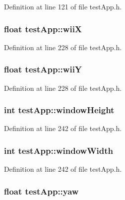 Definition at line 121 of file test\-App.\-h.

\hypertarget{classtest_app_a7a77e8633c3a94e3e409a33a5cd9ae3f}{
\subsubsection[{wii\-X}]{\setlength{\rightskip}{0pt plus 5cm}float test\-App\-::wii\-X}}\label{classtest_app_a7a77e8633c3a94e3e409a33a5cd9ae3f}


Definition at line 228 of file test\-App.\-h.

\hypertarget{classtest_app_a5ae41896388ae16ee530beca5333e02a}{
\subsubsection[{wii\-Y}]{\setlength{\rightskip}{0pt plus 5cm}float test\-App\-::wii\-Y}}\label{classtest_app_a5ae41896388ae16ee530beca5333e02a}


Definition at line 228 of file test\-App.\-h.

\hypertarget{classtest_app_a4e8884eeef5b2657b62278969d4e3dcf}{
\subsubsection[{window\-Height}]{\setlength{\rightskip}{0pt plus 5cm}int test\-App\-::window\-Height}}\label{classtest_app_a4e8884eeef5b2657b62278969d4e3dcf}


Definition at line 242 of file test\-App.\-h.

\hypertarget{classtest_app_a9ed611377cd46f5148a3a3d538e96484}{
\subsubsection[{window\-Width}]{\setlength{\rightskip}{0pt plus 5cm}int test\-App\-::window\-Width}}\label{classtest_app_a9ed611377cd46f5148a3a3d538e96484}


Definition at line 242 of file test\-App.\-h.

\hypertarget{classtest_app_a865985f78dd5def3ed20c87b9fc772b6}{
\subsubsection[{yaw}]{\setlength{\rightskip}{0pt plus 5cm}float test\-App\-::yaw}}\label{classtest_app_a865985f78dd5def3ed20c87b9fc772b6}


